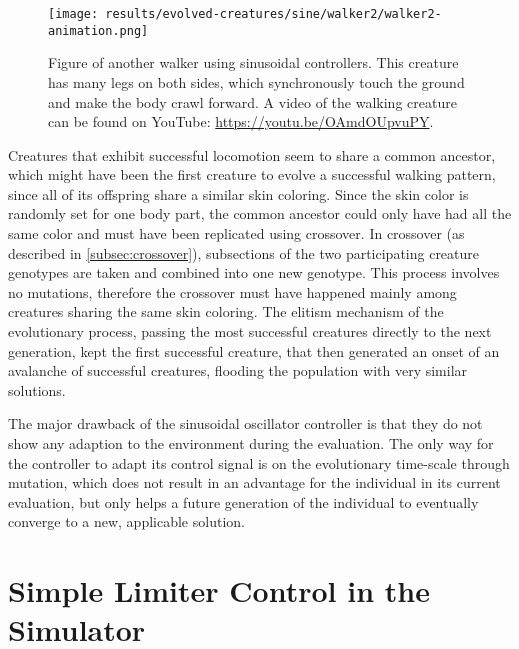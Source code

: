 \documentclass[main]{subfiles}
\begin{document}
\begin{figure}[H]
\centering
\texttt{[image: results/evolved-creatures/sine/walker2/walker2-animation.png]}
\caption[Figure of another walker using sinusoidal controllers.]{Figure of another walker using sinusoidal controllers. This creature has many legs on both sides, which synchronously touch the ground and make the body crawl forward. A video of the walking creature can be found on YouTube: \url{https://youtu.be/OAmdOUpvuPY}.}
\label{figure:successfulcreatures-walker2}
\end{figure}

Creatures that exhibit successful locomotion seem to share a common ancestor, which might have been the first creature to evolve a successful walking pattern, since all of its offspring share a similar skin coloring. %
%
Since the skin color is randomly set for one body part, the common ancestor could only have had all the same color and must have been replicated using crossover. %
%
In crossover (as described in \ref{subsec:crossover}), subsections of the two participating creature genotypes are taken and combined into one new genotype. %
%
This process involves no mutations, therefore the crossover must have happened mainly among creatures sharing the same skin coloring. %
%
The elitism mechanism of the evolutionary process, passing the most successful creatures directly to the next generation, kept the first successful creature, that then generated an onset of an avalanche of successful creatures, flooding the population with very similar solutions. 

The major drawback of the sinusoidal oscillator controller is that they do not show any adaption to the environment during the evaluation. %
%
The only way for the controller to adapt its control signal is on the evolutionary time-scale through mutation, which does not result in an advantage for the individual in its current evaluation, but only helps a future generation of the individual to eventually converge to a new, applicable solution. 

\section{Simple Limiter Control in the Simulator}
\end{document}
